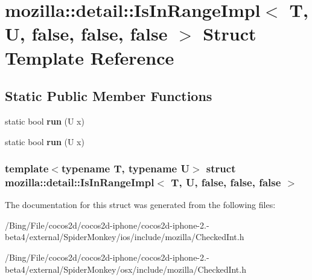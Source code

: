 \hypertarget{structmozilla_1_1detail_1_1_is_in_range_impl_3_01_t_00_01_u_00_01false_00_01false_00_01false_01_4}{\section{mozilla\-:\-:detail\-:\-:Is\-In\-Range\-Impl$<$ T, U, false, false, false $>$ Struct Template Reference}
\label{structmozilla_1_1detail_1_1_is_in_range_impl_3_01_t_00_01_u_00_01false_00_01false_00_01false_01_4}
}
\subsection*{Static Public Member Functions}
\begin{DoxyCompactItemize}
\item 
\hypertarget{structmozilla_1_1detail_1_1_is_in_range_impl_3_01_t_00_01_u_00_01false_00_01false_00_01false_01_4_a6147bf636c2f6b41997c139e4e662dea}{static bool {\bfseries run} (U x)}\label{structmozilla_1_1detail_1_1_is_in_range_impl_3_01_t_00_01_u_00_01false_00_01false_00_01false_01_4_a6147bf636c2f6b41997c139e4e662dea}

\item 
\hypertarget{structmozilla_1_1detail_1_1_is_in_range_impl_3_01_t_00_01_u_00_01false_00_01false_00_01false_01_4_a6147bf636c2f6b41997c139e4e662dea}{static bool {\bfseries run} (U x)}\label{structmozilla_1_1detail_1_1_is_in_range_impl_3_01_t_00_01_u_00_01false_00_01false_00_01false_01_4_a6147bf636c2f6b41997c139e4e662dea}

\end{DoxyCompactItemize}
\subsubsection*{template$<$typename T, typename U$>$ struct mozilla\-::detail\-::\-Is\-In\-Range\-Impl$<$ T, U, false, false, false $>$}



The documentation for this struct was generated from the following files\-:\begin{DoxyCompactItemize}
\item 
/\-Bing/\-File/cocos2d/cocos2d-\/iphone/cocos2d-\/iphone-\/2.-\/beta4/external/\-Spider\-Monkey/ios/include/mozilla/Checked\-Int.\-h\item 
/\-Bing/\-File/cocos2d/cocos2d-\/iphone/cocos2d-\/iphone-\/2.-\/beta4/external/\-Spider\-Monkey/osx/include/mozilla/Checked\-Int.\-h\end{DoxyCompactItemize}
